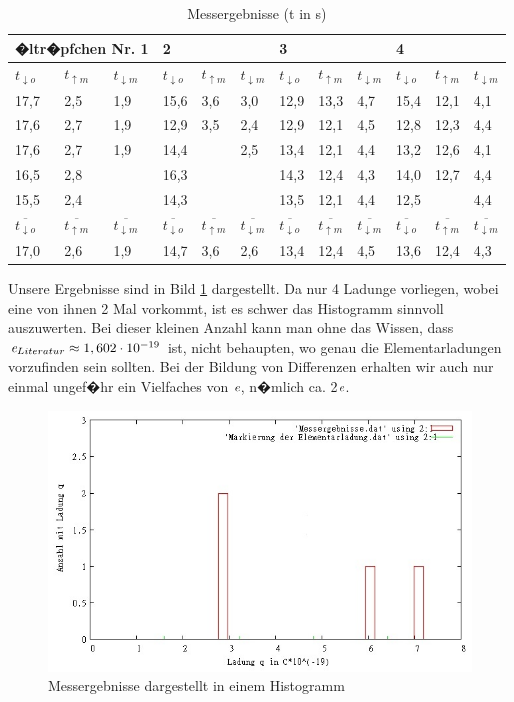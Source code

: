 \documentclass{scrartcl}
\begin{document}
\begin{table}[htb!]%
	\begin{tabular}{l|l|l|l|l|l|l|l|l|l|l|l}
		\multicolumn{3}{l|}{�ltr�pfchen Nr. 1} & \multicolumn{3}{l|}{2}& \multicolumn{3}{l|}{3}& \multicolumn{3}{l}{4}\\
		\hline
		$t_{\downarrow o}$ & $t_{\uparrow m}$& $t_{\downarrow m}$ &$t_{\downarrow o}$ &
		$t_{\uparrow m}$& $t_{\downarrow m}$ &
 		$t_{\downarrow o}$ & $t_{\uparrow m}$& $t_{\downarrow m}$ &
		$t_{\downarrow o}$ & $t_{\uparrow m}$& $t_{\downarrow m}$ \\
		\hline
		17,7 &2,5&1,9&15,6&3,6&3,0&12,9&13,3&4,7&15,4&12,1&4,1\\
		17,6&2,7&1,9&12,9&3,5&2,4&12,9&12,1&4,5&12,8&12,3&4,4\\
		17,6&2,7&1,9&14,4&&2,5&13,4&12,1&4,4&13,2&12,6&4,1\\
		16,5&2,8&&16,3&&&14,3&12,4&4,3&14,0&12,7&4,4\\
		15,5&2,4&&14,3&&&13,5&12,1&4,4&12,5&&4,4\\
		\hline
		$\overline{t_{\downarrow o}}$ & $\overline{t_{\uparrow m}}$& $\overline{t_{\downarrow m}}$ &$\overline{t_{\downarrow o}}$ & $\overline{t_{\uparrow m}}$& $\overline{t_{\downarrow m}}$ &$\overline{t_{\downarrow o}}$ & $\overline{t_{\uparrow m}}$& $\overline{t_{\downarrow m}}$ &$\overline{t_{\downarrow o}}$ & $\overline{t_{\uparrow m}}$& $\overline{t_{\downarrow m}}$\\
		\hline
		17,0&2,6&1,9&14,7&3,6&2,6&13,4&12,4&4,5&13,6&12,4&4,3

	\end{tabular}
	\caption{Messergebnisse (t in s)}
	\label{tab:Messergebnisse}
\end{table}
\vspace{\baselineskip}
Unsere Ergebnisse sind in Bild \ref{fig:Histo} dargestellt. Da nur 4 Ladunge vorliegen, wobei eine von ihnen 2 Mal vorkommt, ist es schwer das Histogramm sinnvoll auszuwerten. Bei dieser kleinen Anzahl kann man ohne das Wissen, dass $\emph{e}_{Literatur}\approx 1,602 \cdot 10^{-19}$ ist, nicht behaupten, wo genau die Elementarladungen vorzufinden sein sollten. Bei der Bildung von Differenzen erhalten wir auch nur einmal ungef�hr ein Vielfaches von $\emph{e}$, n�mlich ca. 2$\emph{e}$. 
\begin{figure}[htb!]%
\includegraphics[width=12cm]{pics/Histo}%
\caption{Messergebnisse dargestellt in einem Histogramm}%
\label{fig:Histo}%
\end{figure}
\end{document}
